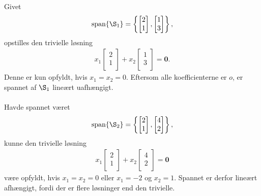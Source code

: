\begin{eks}\label{fisk}
Givet
\begin{align*}
\text{span}\{\S_1 \} =
\left\{ 
\begin{bmatrix}
           2 \\
           1 \\
\end{bmatrix} 
,
\begin{bmatrix}
           1 \\
           3 \\
\end{bmatrix}
\right\},
\end{align*}
opstilles den trivielle løsning  
%
\begin{align*}
x_1 
\begin{bmatrix}
           2 \\
           1 \\
\end{bmatrix} 
+ x_2
\begin{bmatrix}
           1 \\
           3 \\
\end{bmatrix}
= \mathbf{0}.
\end{align*}
%
Denne er kun opfyldt, hvis $x_1=x_2=0$. 
Eftersom alle koefficienterne er $o$, er spannet af $\S_1$ lineært uafhængigt.
\\\\
Havde spannet været 
\begin{align*}
\text{span}\{\S_2 \} =
\left\{ 
\begin{bmatrix}
           2 \\
           1 \\
\end{bmatrix} 
,
\begin{bmatrix}
           4 \\
           2 \\
\end{bmatrix}
\right\},
\end{align*}
%
kunne den trivielle løsning 
%
\begin{align*}
x_1 
\begin{bmatrix}
           2 \\
           1 \\
\end{bmatrix} 
+ x_2
\begin{bmatrix}
           4 \\
           2 \\
\end{bmatrix}
= \mathbf{0}
\end{align*}
%
være opfyldt, hvis $x_1=x_2=0$ eller $x_1=-2$ og $x_2=1$. Spannet er derfor lineært afhængigt, fordi der er flere løsninger end den trivielle.
%
\end{eks}
